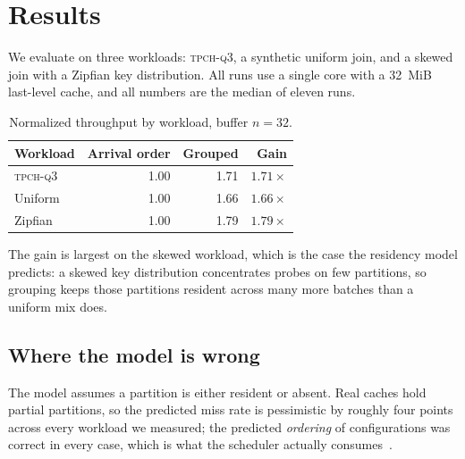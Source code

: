 \section{Results}
\label{sec:results}

We evaluate on three workloads: \textsc{tpch-q3}, a synthetic uniform
join, and a skewed join with a Zipfian key distribution. All runs use a
single core with a 32~MiB last-level cache, and all numbers are the median
of eleven runs.

\begin{table}[htbp]
\centering
\begin{tabular}{lrrr}
\toprule
Workload & Arrival order & Grouped & Gain \\
\midrule
\textsc{tpch-q3} & 1.00 & 1.71 & \(1.71\times\) \\
Uniform & 1.00 & 1.66 & \(1.66\times\) \\
Zipfian & 1.00 & 1.79 & \(1.79\times\) \\
\bottomrule
\end{tabular}
\caption{Normalized throughput by workload, buffer \(n = 32\).}
\label{tab:main}
\end{table}

The gain is largest on the skewed workload, which is the case the
residency model predicts: a skewed key distribution concentrates probes
on few partitions, so grouping keeps those partitions resident across
many more batches than a uniform mix does.

\subsection{Where the model is wrong}

The model assumes a partition is either resident or absent. Real caches
hold partial partitions, so the predicted miss rate is pessimistic by
roughly four points across every workload we measured; the predicted
\emph{ordering} of configurations was correct in every case, which is
what the scheduler actually consumes~\cite{blanas2011}.

